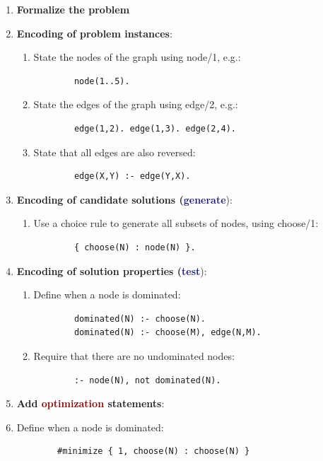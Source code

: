 \begin{enumerate}
    \item \textbf{Formalize the problem}
    \item \textbf{Encoding of problem instances}:
    \begin{enumerate}
        \item State the nodes of the graph using node/1, e.g.:
        \begin{lstlisting}
        node(1..5).
        \end{lstlisting}
        \item State the edges of the graph using edge/2, e.g.:
        \begin{lstlisting}
        edge(1,2). edge(1,3). edge(2,4).
        \end{lstlisting}
        \item State that all edges are also reversed:
        \begin{lstlisting}
        edge(X,Y) :- edge(Y,X).
        \end{lstlisting}
    \end{enumerate}
    \item \textbf{Encoding of candidate solutions (\textcolor{MidnightBlue}{generate}}):
    \begin{enumerate}
        \item Use a choice rule to generate all subsets of nodes, using choose/1:
        \begin{lstlisting}
        { choose(N) : node(N) }.
        \end{lstlisting}
    \end{enumerate}
    \item \textbf{Encoding of solution properties (\textcolor{MidnightBlue}{test}}):
    \begin{enumerate}
        \item Define when a node is \textcolor{PineGreen}{dominated}:
        \begin{lstlisting}
        dominated(N) :- choose(N).
        dominated(N) :- choose(M), edge(N,M).
        \end{lstlisting}
        \item Require that there are  \textcolor{PineGreen}{no undominated} nodes:
        \begin{lstlisting}
        :- node(N), not dominated(N).
        \end{lstlisting}
    \end{enumerate}
    \item \textbf{Add \textcolor{Maroon}{optimization} statements}:
    \item Define when a node is \textcolor{PineGreen}{dominated}:
        \begin{lstlisting}
        #minimize { 1, choose(N) : choose(N) }
        \end{lstlisting}
\end{enumerate}

